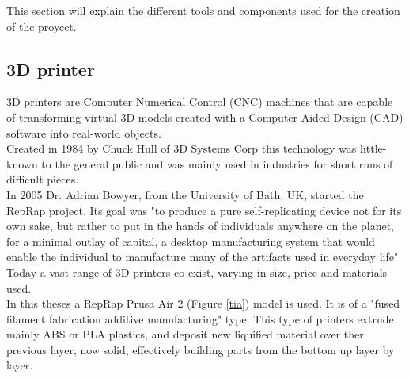 This section will explain the different tools and components used for the creation of the proyect.


\subsection{3D printer}

	3D printers are Computer Numerical Control (CNC) machines that are capable of transforming virtual 3D models created with a Computer Aided Design (CAD) software into real-world objects.\\

	Created in 1984 by Chuck Hull of 3D Systems Corp this technology was little-known to the general public and was mainly used in industries for short runs of difficult pieces.\\
	In 2005 Dr. Adrian Bowyer, from the University of Bath, UK, started the RepRap project. Its goal was "to produce a pure self-replicating device not for its own sake, but rather to put in the hands of individuals anywhere on the planet, for a minimal outlay of capital, a desktop manufacturing system that would enable the individual to manufacture many of the artifacts used in everyday life" \\

	Today a vast range of 3D printers co-exist, varying in size, price and materials used. \\




	In this theses a RepRap Prusa Air 2 (Figure \ref{tia}) model is used. It is of a "fused filament fabrication additive manufacturing" type. This type of printers extrude mainly ABS or PLA plastics, and deposit new liquified material over ther previous layer, now solid, effectively building parts from the bottom up layer by layer.\\

